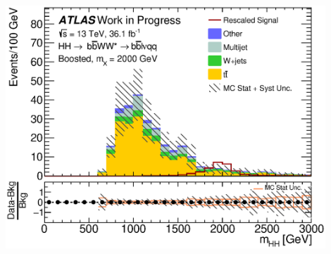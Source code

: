\documentclass{beamer}
\newcommand*{\header}[1]{\fontsize{16}{8}\selectfont \textbf{{\color{MyPurple}{#1}}}}
\begin{document}
\begin{frame}
\begin{center}
\header{Results}
\end{center}
\vspace{-0.2cm}
\begin{center}
\includegraphics[width=0.9\textwidth]{figures/C_2tag_SR_lepton_presel_met50_hhMassRebin1}
\end{center}
\end{frame}
\end{document}
